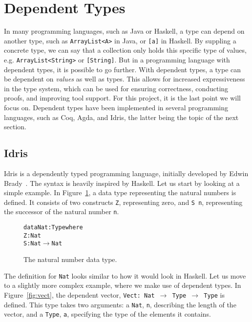 \section{Dependent Types}
\label{sec:DependentTypes}
In many programming languages, such as Java or Haskell, a type can depend on another type, such as \texttt{ArrayList<A>} in Java, or \texttt{[a]} in Haskell. By suppling a concrete type, we can say that a collection only holds this specific type of values, e.g. \texttt{ArrayList<String>} or \texttt{[String]}. But in a programming language with dependent types, it is possible to go further. With dependent types, a type can be dependent on \emph{values} as well as types. This allows for increased expressiveness in the type system, which can be used for ensuring correctness, conducting proofs, and improving tool support. For this project, it is the last point we will focus on. Dependent types have been implemented in several programming languages, such as Coq, Agda, and Idris, the latter being the topic of the next
section.

\subsection{Idris}
\label{subsec:Idris}
Idris is a dependently typed programming language, initially developed by Edwin Brady~\cite{Idris}. The syntax is heavily inspired by Haskell. Let us start by looking at a simple example. In Figure~\ref{fig:nat}, a data type representing the natural numbers is defined. It consists of two constructs \texttt{Z}, representing zero, and \texttt{S~n}, representing the successor of the natural number \texttt{n}.

\begin{figure}
\begin{alltt}
data Nat : Type where
  Z : Nat
  S : Nat \(\to\) Nat
\end{alltt}
\caption{The natural number data type.}
\label{fig:nat}
\end{figure}

The definition for \texttt{Nat} looks similar to how it would look in Haskell. Let us move to a slightly more complex example, where we make use of dependent types. In Figure~\ref{fig:vect}, the dependent vector, \texttt{Vect: Nat $\to$ Type $\to$ Type} is defined. This type takes two arguments: a \texttt{Nat}, \texttt{n}, describing the length of the vector, and a \texttt{Type}, \texttt{a}, specifying the type of the elements it contains.

